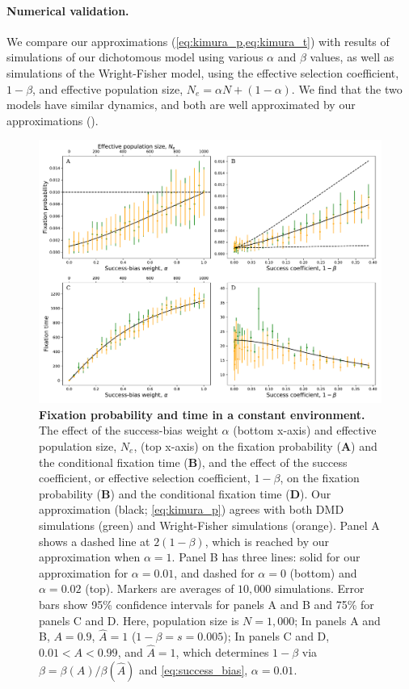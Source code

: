 \documentclass[12pt]{extarticle}
\begin{document}
\paragraph{Numerical validation.}
We compare our approximations (\cref{eq:kimura_p,eq:kimura_t}) with results of simulations of our dichotomous model using various $\alpha$ and $\beta$ values, as well as simulations of the Wright-Fisher model, using the effective selection coefficient, $1-\beta$, and effective population size, $N_e=\alpha N + (1-\alpha)$. 
We find that the two models have similar dynamics, and both are well approximated by our approximations ().


\begin{figure}[h]
    \includegraphics[width=0.9\linewidth]{kimura_var.pdf}
  \caption{\textbf{Fixation probability and time in a constant environment.}
	The effect of the success-bias weight $\alpha$ (bottom x-axis) and effective population size, $N_e$, (top x-axis) on the fixation probability (\textbf{A}) and the conditional fixation time (\textbf{B}), and the effect of the success coefficient, or effective selection coefficient, $1-\beta$, on the fixation probability (\textbf{B}) and the conditional fixation time (\textbf{D}).
	Our approximation (black; \cref{eq:kimura_p}) agrees with both DMD simulations (green) and Wright-Fisher simulations (orange).
	Panel A shows a dashed line at $2(1-\beta)$, which is reached by our approximation when $\alpha=1$.
	Panel B has three lines: solid for our approximation for $\alpha=0.01$, and dashed for $\alpha=0$ (bottom) and $\alpha=0.02$ (top).
	Markers are averages of $10,000$ simulations. Error bars show 95\% confidence intervals for panels A and B and 75\% for panels C and D.
   	Here, population size is $N=1,000$; 
	In panels A and B, $A=0.9$, $\hat{A}=1$ ($1-\beta=s=0.005$);
	In panels C and D, $0.01 < A< 0.99$, and $\hat{A}=1$, which determines $1-\beta$ via $\beta = \beta(A)/\beta(\hat{A})$ and \cref{eq:success_bias}, $\alpha=0.01$.
   }
  \label{fig:var_alpha}
\end{figure}
\end{document}
